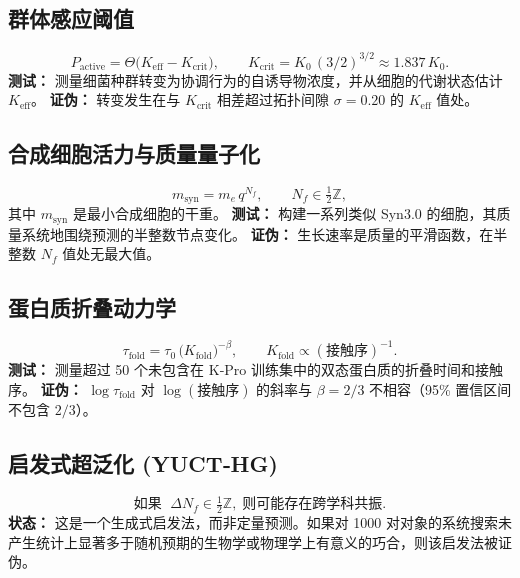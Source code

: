 \documentclass[11pt,a4paper]{article}
\begin{document}
	\subsection{群体感应阈值}
	
	\begin{equation}\label{eq:pred-qs}
		P_{\mathrm{active}} =
		\Theta\!\bigl(K_{\mathrm{eff}} - K_{\mathrm{crit}}\bigr),\qquad
		K_{\mathrm{crit}} = K_0\,(3/2)^{3/2} \approx 1.837\,K_0 .
	\end{equation}
	\textbf{测试：} 测量细菌种群转变为协调行为的自诱导物浓度，并从细胞的代谢状态估计 \(K_{\mathrm{eff}}\)。
	\textbf{证伪：} 转变发生在与 \(K_{\mathrm{crit}}\) 相差超过拓扑间隙 \(\sigma=0.20\) 的 \(K_{\mathrm{eff}}\) 值处。
	
	\subsection{合成细胞活力与质量量子化}
	
	\begin{equation}\label{eq:pred-syn}
		m_{\mathrm{syn}} = m_e\,q^{N_f},\qquad N_f\in\tfrac12\mathbb{Z},
	\end{equation}
	其中 \(m_{\mathrm{syn}}\) 是最小合成细胞的干重。
	\textbf{测试：} 构建一系列类似 Syn3.0 的细胞，其质量系统地围绕预测的半整数节点变化。
	\textbf{证伪：} 生长速率是质量的平滑函数，在半整数 \(N_f\) 值处无最大值。
	
	\subsection{蛋白质折叠动力学}
	
	\begin{equation}\label{eq:pred-fold}
		\tau_{\mathrm{fold}} = \tau_0\,
		\bigl(K_{\mathrm{fold}}\bigr)^{-\beta},\qquad
		K_{\mathrm{fold}} \propto (\text{接触序})^{-1}.
	\end{equation}
	\textbf{测试：} 测量超过 50 个未包含在 K‑Pro 训练集中的双态蛋白质的折叠时间和接触序。
	\textbf{证伪：} \(\log\tau_{\mathrm{fold}}\) 对 \(\log(\text{接触序})\) 的斜率与 \(\beta=2/3\) 不相容（95\% 置信区间不包含 \(2/3\)）。
	
	\subsection{启发式超泛化 (YUCT‑HG)}
	
	\begin{equation}\label{eq:pred-hg}
		\text{如果 }\; \Delta N_f \in \tfrac12\mathbb{Z},\;
		\text{则可能存在跨学科共振.}
	\end{equation}
	\textbf{状态：} 这是一个生成式启发法，而非定量预测。如果对 1000 对对象的系统搜索未产生统计上显著多于随机预期的生物学或物理学上有意义的巧合，则该启发法被证伪。
	
\end{document}
